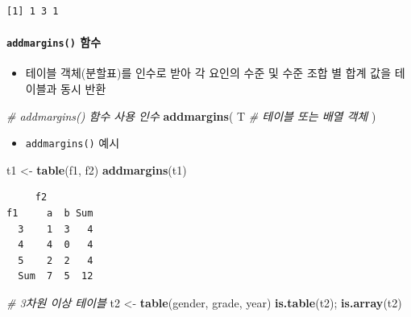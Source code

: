 \documentclass[
  11pt,
]{krantz}
\newenvironment{Shaded}{\begin{snugshade}}{\end{snugshade}}
\newcommand{\CommentTok}[1]{\textcolor[rgb]{0.37,0.37,0.37}{\textit{#1}}}
\newcommand{\KeywordTok}[1]{\textcolor[rgb]{0.27,0.27,0.27}{\textbf{#1}}}
\newcommand{\NormalTok}[1]{#1}
\newcommand{\StringTok}[1]{\textcolor[rgb]{0.5,0.5,0.5}{#1}}
\providecommand{\tightlist}{%
  \setlength{\itemsep}{0pt}\setlength{\parskip}{0pt}}
\begin{document}
\begin{verbatim}
[1] 1 3 1
\end{verbatim}

\normalsize

\hypertarget{tab-fun2}{%
\paragraph{\texorpdfstring{\texttt{addmargins()} 함수}{addmargins() 함수}}\label{tab-fun2}}

\begin{itemize}
\tightlist
\item
  테이블 객체(분할표)를 인수로 받아 각 요인의 수준 및 수준 조합 별 합계 값을 테이블과 동시 반환
\end{itemize}

\footnotesize

\begin{Shaded}
\begin{Highlighting}[]
\CommentTok{# addmargins() 함수 사용 인수}
\KeywordTok{addmargins}\NormalTok{(}
\NormalTok{  T }\CommentTok{# 테이블 또는 배열 객체 }
\NormalTok{)}
\end{Highlighting}
\end{Shaded}

\normalsize

\begin{itemize}
\tightlist
\item
  \texttt{addmargins()} 예시
\end{itemize}

\footnotesize

\begin{Shaded}
\begin{Highlighting}[]
\NormalTok{t1 <-}\StringTok{ }\KeywordTok{table}\NormalTok{(f1, f2)}
\KeywordTok{addmargins}\NormalTok{(t1)}
\end{Highlighting}
\end{Shaded}

\begin{verbatim}
     f2
f1     a  b Sum
  3    1  3   4
  4    4  0   4
  5    2  2   4
  Sum  7  5  12
\end{verbatim}

\begin{Shaded}
\begin{Highlighting}[]
\CommentTok{# 3차원 이상 테이블}
\NormalTok{t2 <-}\StringTok{ }\KeywordTok{table}\NormalTok{(gender, grade, year)}
\KeywordTok{is.table}\NormalTok{(t2); }\KeywordTok{is.array}\NormalTok{(t2)}
\end{Highlighting}
\end{Shaded}
\end{document}
